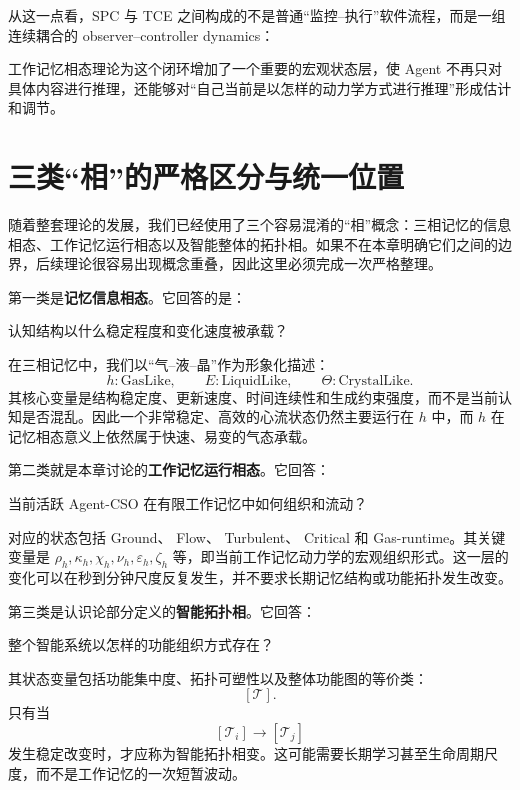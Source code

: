从这一点看，SPC 与 TCE 之间构成的不是普通“监控--执行”软件流程，而是一组连续耦合的 observer--controller dynamics：
\begin{statementbox}
\centering
{}
\end{statementbox}
工作记忆相态理论为这个闭环增加了一个重要的宏观状态层，使 Agent 不再只对具体内容进行推理，还能够对“自己当前是以怎样的动力学方式进行推理”形成估计和调节。

\section{三类“相”的严格区分与统一位置}

随着整套理论的发展，我们已经使用了三个容易混淆的“相”概念：三相记忆的信息相态、工作记忆运行相态以及智能整体的拓扑相。如果不在本章明确它们之间的边界，后续理论很容易出现概念重叠，因此这里必须完成一次严格整理。

第一类是\textbf{记忆信息相态}。它回答的是：
\begin{statementbox}
认知结构以什么稳定程度和变化速度被承载？
\end{statementbox}
在三相记忆中，我们以“气--液--晶”作为形象化描述：
\[
h:\mathrm{GasLike},
\qquad
E:\mathrm{LiquidLike},
\qquad
\Theta:\mathrm{CrystalLike}.
\]
其核心变量是结构稳定度、更新速度、时间连续性和生成约束强度，而不是当前认知是否混乱。因此一个非常稳定、高效的心流状态仍然主要运行在 $h$ 中，而 $h$ 在记忆相态意义上依然属于快速、易变的气态承载。

第二类就是本章讨论的\textbf{工作记忆运行相态}。它回答：
\begin{statementbox}
当前活跃 Agent-CSO 在有限工作记忆中如何组织和流动？
\end{statementbox}
对应的状态包括 Ground、 Flow、 Turbulent、 Critical 和 Gas-runtime。其关键变量是 $\rho_h,\kappa_h,\chi_h,\nu_h,\varepsilon_h,\zeta_h$ 等，即当前工作记忆动力学的宏观组织形式。这一层的变化可以在秒到分钟尺度反复发生，并不要求长期记忆结构或功能拓扑发生改变。

第三类是认识论部分定义的\textbf{智能拓扑相}。它回答：
\begin{definition*}
整个智能系统以怎样的功能组织方式存在？
\end{definition*}
其状态变量包括功能集中度、拓扑可塑性以及整体功能图的等价类：
\[
[\mathcal T].
\]
只有当
\[
[\mathcal T_i]
\rightarrow
[\mathcal T_j]
\]
发生稳定改变时，才应称为智能拓扑相变。这可能需要长期学习甚至生命周期尺度，而不是工作记忆的一次短暂波动。

